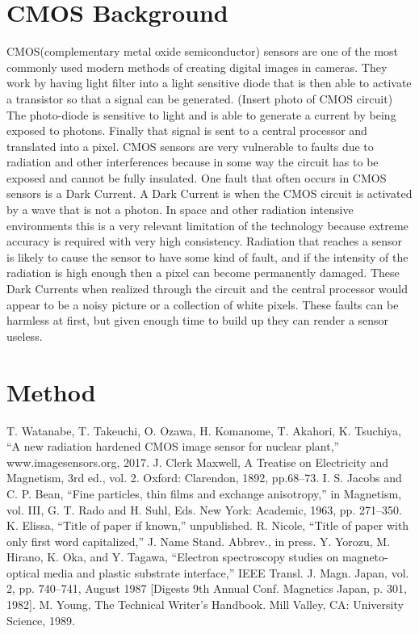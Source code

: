 \documentclass[conference]{IEEEtran}
\begin{document}
\section{CMOS Background}
CMOS(complementary metal oxide semiconductor) sensors are one of the most commonly used modern methods of creating digital images in cameras.  They work by having light filter into a light sensitive diode that is then able to activate a transistor so that a signal can be generated.  (Insert photo of CMOS circuit)  The photo-diode is sensitive to light and is able to generate a current by being exposed to photons.  Finally that signal is sent to a central processor and translated into a pixel.  CMOS sensors are very vulnerable to faults due to radiation and other interferences because in some way the circuit has to be exposed and cannot be fully insulated.  One fault that often occurs in CMOS sensors is a Dark Current.  A Dark Current is when the CMOS circuit is activated by a wave that is not a photon.  In space and other radiation intensive environments this is a very relevant limitation of the technology because extreme accuracy is required with very high consistency.  Radiation that reaches a sensor is likely to cause the sensor to have some kind of fault, and if the intensity of the radiation is high enough then a pixel can become permanently damaged.  These Dark Currents when realized through the circuit and the central processor would appear to be a noisy picture or a collection of white pixels.  These faults can be harmless at first, but given enough time to build up they can render a sensor useless.  
\section{Method}


\begin{thebibliography}{00}
T. Watanabe, T. Takeuchi, O. Ozawa, H. Komanome, T. Akahori, K. Tsuchiya,  ``A new radiation hardened CMOS image sensor for nuclear plant,''  www.imagesensors.org, 2017.
 J. Clerk Maxwell, A Treatise on Electricity and Magnetism, 3rd ed., vol. 2. Oxford: Clarendon, 1892, pp.68--73.
 I. S. Jacobs and C. P. Bean, ``Fine particles, thin films and exchange anisotropy,'' in Magnetism, vol. III, G. T. Rado and H. Suhl, Eds. New York: Academic, 1963, pp. 271--350.
 K. Elissa, ``Title of paper if known,'' unpublished.
 R. Nicole, ``Title of paper with only first word capitalized,'' J. Name Stand. Abbrev., in press.
 Y. Yorozu, M. Hirano, K. Oka, and Y. Tagawa, ``Electron spectroscopy studies on magneto-optical media and plastic substrate interface,'' IEEE Transl. J. Magn. Japan, vol. 2, pp. 740--741, August 1987 [Digests 9th Annual Conf. Magnetics Japan, p. 301, 1982].
 M. Young, The Technical Writer's Handbook. Mill Valley, CA: University Science, 1989.
\end{thebibliography}
\end{document}
